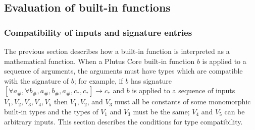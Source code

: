 

  
\subsection{Evaluation of built-in functions}
\label{sec:builtin-evaluation}

\subsubsection{Compatibility of inputs and signature entries}
\label{sec:compatibility}
The previous section describes how a built-in function is interpreted as a
mathematical function.  When a Plutus Core built-in function $b$ is applied to a
sequence of arguments, the arguments must have types which are compatible with
the signature of $b$; for example, if $b$ has signature $[\forall a_\#, \forall
  b_\#, a_\#, b_\#, a_\#, c_*, c_*] \rightarrow c_*$ and $b$ is applied to a
sequence of inputs $V_1, V_2, V_3, V_4, V_5$ then $V_1, V_2$, and $V_3$ must all
be constants of some monomorphic built-in types and the types of $V_1$ and $V_3$
must be the same; $V_4$ and $V_5$ can be arbitrary inputs.  This section
describes the conditions for type compatibility.

  

